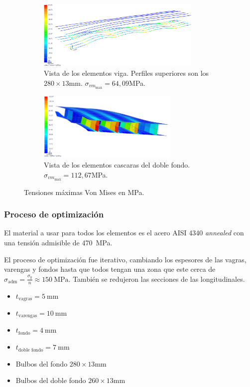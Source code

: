 \documentclass[onecolumn,10pt,titlepage]{article}
\newcommand{\adm}{\textrm{adm}}
\begin{document}
 \begin{figure}[htb!]
 \centering
 \begin{subfigure}{0.49\textwidth}
 \begin{framed}
 \includegraphics[height=3.3cm,draft]{fig/longitudinales_a.png}
 \caption{Vista de los elementos viga. Perfiles superiores son los $280\times 13\si{\milli \meter}$. $\sigma_{vm_{\max}}= 64,09 $\si{\mega \pascal}.}
 \label{fig:longitudinalesCasoA}
 \end{framed}
 \end{subfigure}
 \begin{subfigure}{0.49\textwidth}
 \begin{framed}
 \includegraphics[height=3.3cm,draft]{fig/varengas_a.png}
 \caption{Vista de los elementos cascaras del doble fondo. $\sigma_{vm_{\max}}= 112,67 $\si{\mega \pascal}.}
 \label{fig:VarengasCasoA}
 \end{framed}
 \end{subfigure}
 \caption{Tensiones máximas Von Mises en \si{\mega \pascal}.}
 \label{fig:2a}
 \end{figure}

\subsubsection*{Proceso de optimización}
El material a usar para todos los elementos es el acero AISI 4340 \emph{annealed} con una tensión admisible de \SI{470}{\mega \pascal}.

El proceso de optimización fue iterativo, cambiando los espesores de las vagras, varengas y fondos hasta que todos tengan una zona que este cerca de $\sigma_{\adm}=\frac{\sigma_{y}}{n}\approx\SI{150}{\mega \pascal}$. También se redujeron las secciones de las longitudinales.
\begin{itemize}
	\item $t_{\textrm{vagras}}=\SI{5}{\milli \meter}$
	\item $t_{\textrm{varengas}}=\SI{10}{\milli \meter}$
	\item $t_{\textrm{fondo}}=\SI{4}{\milli \meter}$
	\item $t_{\textrm{doble fondo}}=\SI{7}{\milli \meter}$
	\item Bulbos del fondo $280\times 13$\si{\milli \meter}
	\item Bulbos del doble fondo $260\times 13$\si{\milli \meter}
\end{itemize}
\end{document}
